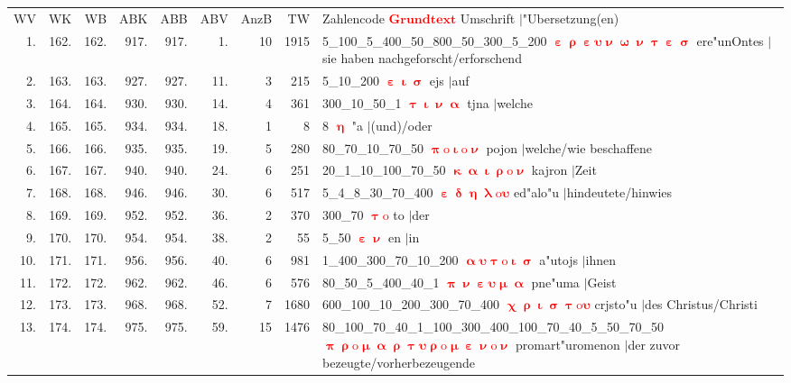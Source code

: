 \documentclass[a4paper,10pt,landscape]{article}
\begin{document}
\begin{tabular}{rrrrrrrrp{120mm}}
WV&WK&WB&ABK&ABB&ABV&AnzB&TW&Zahlencode \textcolor{red}{$\boldsymbol{Grundtext}$} Umschrift $|$"Ubersetzung(en)\\
1.&162.&162.&917.&917.&1.&10&1915&5\_100\_5\_400\_50\_800\_50\_300\_5\_200 \textcolor{red}{$\boldsymbol{\upepsilon\uprho\upepsilon\upsilon\upnu\upomega\upnu\uptau\upepsilon\upsigma}$} ere"unOntes $|$sie haben nachgeforscht/erforschend\\
2.&163.&163.&927.&927.&11.&3&215&5\_10\_200 \textcolor{red}{$\boldsymbol{\upepsilon\upiota\upsigma}$} ejs $|$auf\\
3.&164.&164.&930.&930.&14.&4&361&300\_10\_50\_1 \textcolor{red}{$\boldsymbol{\uptau\upiota\upnu\upalpha}$} tjna $|$welche\\
4.&165.&165.&934.&934.&18.&1&8&8 \textcolor{red}{$\boldsymbol{\upeta}$} "a $|$(und)/oder\\
5.&166.&166.&935.&935.&19.&5&280&80\_70\_10\_70\_50 \textcolor{red}{$\boldsymbol{\uppi\mathrm{o}\upiota\mathrm{o}\upnu}$} pojon $|$welche/wie beschaffene\\
6.&167.&167.&940.&940.&24.&6&251&20\_1\_10\_100\_70\_50 \textcolor{red}{$\boldsymbol{\upkappa\upalpha\upiota\uprho\mathrm{o}\upnu}$} kajron $|$Zeit\\
7.&168.&168.&946.&946.&30.&6&517&5\_4\_8\_30\_70\_400 \textcolor{red}{$\boldsymbol{\upepsilon\updelta\upeta\uplambda\mathrm{o}\upsilon}$} ed"alo"u $|$hindeutete/hinwies\\
8.&169.&169.&952.&952.&36.&2&370&300\_70 \textcolor{red}{$\boldsymbol{\uptau\mathrm{o}}$} to $|$der\\
9.&170.&170.&954.&954.&38.&2&55&5\_50 \textcolor{red}{$\boldsymbol{\upepsilon\upnu}$} en $|$in\\
10.&171.&171.&956.&956.&40.&6&981&1\_400\_300\_70\_10\_200 \textcolor{red}{$\boldsymbol{\upalpha\upsilon\uptau\mathrm{o}\upiota\upsigma}$} a"utojs $|$ihnen\\
11.&172.&172.&962.&962.&46.&6&576&80\_50\_5\_400\_40\_1 \textcolor{red}{$\boldsymbol{\uppi\upnu\upepsilon\upsilon\upmu\upalpha}$} pne"uma $|$Geist\\
12.&173.&173.&968.&968.&52.&7&1680&600\_100\_10\_200\_300\_70\_400 \textcolor{red}{$\boldsymbol{\upchi\uprho\upiota\upsigma\uptau\mathrm{o}\upsilon}$} crjsto"u $|$des Christus/Christi\\
13.&174.&174.&975.&975.&59.&15&1476&80\_100\_70\_40\_1\_100\_300\_400\_100\_70\_40\_5\_50\_70\_50 \textcolor{red}{$\boldsymbol{\uppi\uprho\mathrm{o}\upmu\upalpha\uprho\uptau\upsilon\uprho\mathrm{o}\upmu\upepsilon\upnu\mathrm{o}\upnu}$} promart"uromenon $|$der zuvor bezeugte/vorherbezeugende\\

\end{tabular}
\end{document}
